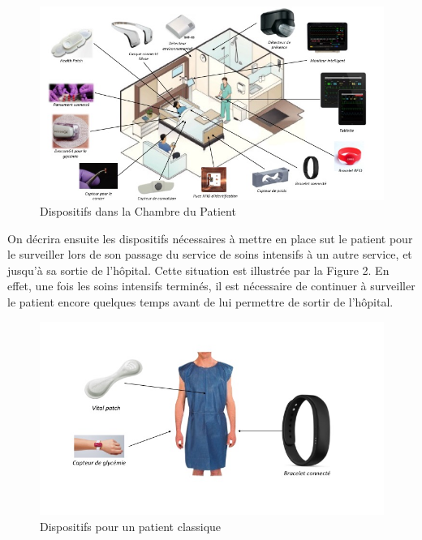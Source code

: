 \documentclass{article}
\begin{document}
\begin{figure}[h!]
	\hspace*{-3cm}
	\centering
	\includegraphics[width=1.5\textwidth]{Figure1.jpg}
	\caption{Dispositifs dans la Chambre du Patient}
	\label{fig:balance}
\end{figure}

On décrira ensuite les dispositifs nécessaires à mettre en place sut le patient pour le surveiller lors de son passage du service de soins intensifs à un autre service, et jusqu’à sa sortie de l’hôpital. Cette situation est illustrée par la Figure 2. En effet, une fois les soins intensifs terminés, il est nécessaire de continuer à surveiller le patient encore quelques temps avant de lui permettre de sortir de l’hôpital.
\\
\begin{figure}[h!]
	\hspace*{-1cm}
	\centering
	\includegraphics[width=1.2\textwidth]{Figure2.jpg}
	\caption{Dispositifs pour un patient classique}
	\label{fig:balance}
\end{figure}
\end{document}
